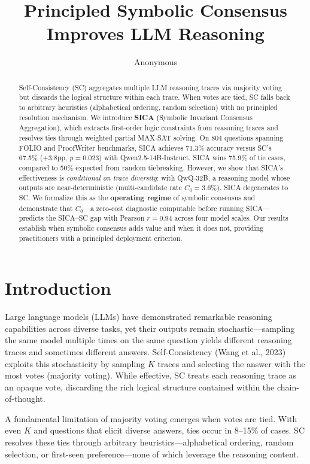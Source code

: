 \documentclass[11pt,a4paper]{article}
\title{Principled Symbolic Consensus Improves LLM Reasoning}
\author{Anonymous}
\begin{document}
\maketitle

\begin{abstract}
Self-Consistency (SC) aggregates multiple LLM reasoning traces via majority voting but discards the logical structure within each trace.
When votes are tied, SC falls back to arbitrary heuristics (alphabetical ordering, random selection) with no principled resolution mechanism.
We introduce \textbf{SICA} (Symbolic Invariant Consensus Aggregation), which extracts first-order logic constraints from reasoning traces and resolves ties through weighted partial MAX-SAT solving.
On 804 questions spanning FOLIO and ProofWriter benchmarks, SICA achieves 71.3\% accuracy versus SC's 67.5\% (+3.8pp, $p=0.023$) with Qwen2.5-14B-Instruct.
SICA wins 75.9\% of tie cases, compared to 50\% expected from random tiebreaking.
However, we show that SICA's effectiveness is \emph{conditional on trace diversity}: with QwQ-32B, a reasoning model whose outputs are near-deterministic (multi-candidate rate $C_0=3.6\%$), SICA degenerates to SC.
We formalize this as the \textbf{operating regime} of symbolic consensus and demonstrate that $C_0$---a zero-cost diagnostic computable before running SICA---predicts the SICA--SC gap with Pearson $r=0.94$ across four model scales.
Our results establish when symbolic consensus adds value and when it does not, providing practitioners with a principled deployment criterion.
\end{abstract}

\section{Introduction}
\label{sec:intro}

Large language models (LLMs) have demonstrated remarkable reasoning capabilities across diverse tasks, yet their outputs remain stochastic---sampling the same model multiple times on the same question yields different reasoning traces and sometimes different answers.
Self-Consistency (Wang et al., 2023) exploits this stochasticity by sampling $K$ traces and selecting the answer with the most votes (majority voting).
While effective, SC treats each reasoning trace as an opaque vote, discarding the rich logical structure contained within the chain-of-thought.

A fundamental limitation of majority voting emerges when votes are tied.
With even $K$ and questions that elicit diverse answers, ties occur in 8--15\% of cases.
SC resolves these ties through arbitrary heuristics---alphabetical ordering, random selection, or first-seen preference---none of which leverage the reasoning content.
\end{document}
